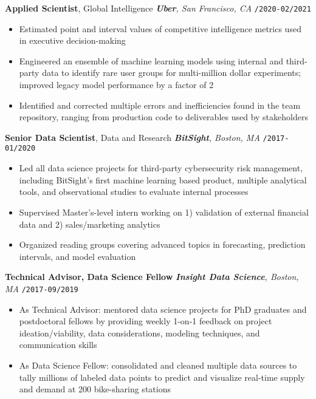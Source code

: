 \documentclass[10pt,english]{report}
\newcommand{\blockbreak} {
    \vspace{2mm}
}
\begin{document}
\blockbreak

\textbf{Applied Scientist}, Global Intelligence \hfill \textit{\textbf{Uber}, San Francisco, CA} \texttt{/2020-02/2021}
\begin{itemize}
    \item Estimated point and interval values of competitive intelligence metrics used in executive decision-making
    \item Engineered an ensemble of machine learning models using internal and third-party data to identify rare user groups for multi-million dollar experiments; improved legacy model performance by a factor of 2
    \item Identified and corrected multiple errors and inefficiencies found in the team repository, ranging from production code to deliverables used by stakeholders
\end{itemize}

\blockbreak

\textbf{Senior Data Scientist}, Data and Research \hfill \textit{\textbf{BitSight}, Boston, MA} \texttt{/2017-01/2020}
\begin{itemize}
    \item Led all data science projects for third-party cybersecurity risk management, including BitSight's first machine learning based product, multiple analytical tools, and observational studies to evaluate internal processes
    \item Supervised Master's-level intern working on 1) validation of external financial data and 2) sales/marketing analytics
    \item Organized reading groups covering advanced topics in forecasting, prediction intervals, and model evaluation
\end{itemize}

\blockbreak

\textbf{Technical Advisor, Data Science Fellow} \hfill \textit{\textbf{Insight Data Science}, Boston, MA} \texttt{/2017-09/2019}
\begin{itemize}
    \item As Technical Advisor: mentored data science projects for PhD graduates and postdoctoral fellows by providing weekly 1-on-1 feedback on project ideation/viability, data considerations, modeling techniques, and communication skills
    \item As Data Science Fellow: consolidated and cleaned multiple data sources to tally millions of labeled data points to predict and visualize real-time supply and demand at 200 bike-sharing stations
\end{itemize}
\end{document}
